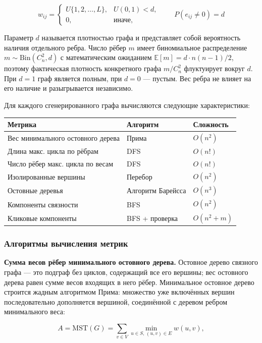 \documentclass[14pt]{extarticle}
\begin{document}
$$w_{ij} = \begin{cases} U\{1, 2, \ldots, L\}, & U(0,1) < d, \\ 0, & \text{иначе}, \end{cases} \qquad P(e_{ij} \neq 0) = d$$

Параметр \(d\) называется плотностью графа и представляет собой вероятность наличия отдельного ребра. Число рёбер \(m\) имеет биномиальное распределение \(m \sim \mathrm{Bin}(C_n^2, d)\) с математическим ожиданием \(\mathbb{E}[m] = d \cdot n(n-1)/2\), поэтому фактическая плотность конкретного графа \(m/C_n^2\) флуктуирует вокруг \(d\). При \(d = 1\) граф является полным, при \(d = 0\) --- пустым. Вес ребра не влияет на его наличие и разыгрывается независимо.

Для каждого сгенерированного графа вычисляются следующие характеристики:

\begin{center}
\begin{tabular}{lll}
Метрика & Алгоритм & Сложность\\
\hline
Вес минимального остовного дерева & Прима & \(O(n^2)\)\\
Длина макс. цикла по рёбрам & DFS & \(O(n!)\)\\
Число рёбер макс. цикла по весам & DFS & \(O(n!)\)\\
Изолированные вершины & Перебор & \(O(n^2)\)\\
Остовные деревья & Алгоритм Барейсса & \(O(n^3)\)\\
Компоненты связности & BFS & \(O(n^2)\)\\
Кликовые компоненты & BFS + проверка & \(O(n^2+m)\)\\
\end{tabular}
\end{center}
\subsubsection{Алгоритмы вычисления метрик}
\label{sec:orgd92e254}

\textbf{Сумма весов рёбер минимального остовного дерева.} Остовное дерево связного графа --- это подграф без циклов, содержащий все его вершины; вес остовного дерева равен сумме весов входящих в него рёбер. Минимальное остовное дерево строится жадным алгоритмом Прима: множество уже включённых вершин последовательно дополняется вершиной, соединённой с деревом ребром минимального веса:

$$A = \text{MST}(G) = \sum_{v \in V} \min_{u \in S,\, (u,v) \in E} w(u, v),$$
\end{document}
